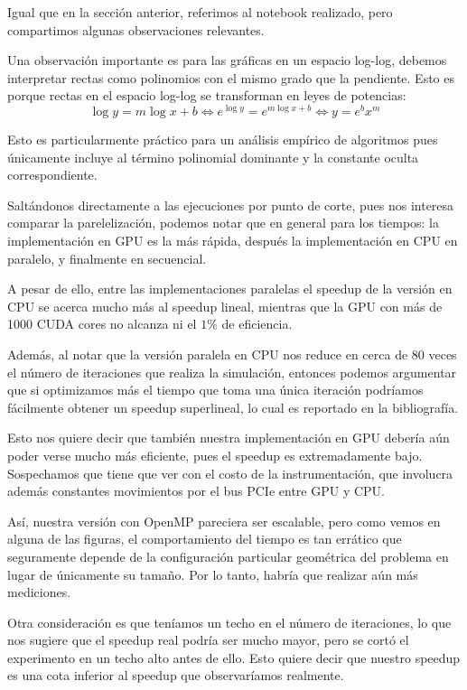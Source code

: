 \documentclass[main.tex]{subfiles}
\begin{document}
Igual que en la sección anterior, referimos al notebook realizado, pero
compartimos algunas observaciones relevantes.

Una observación importante es para las gráficas en un espacio log-log, debemos
interpretar rectas como polinomios con el mismo grado que la pendiente. Esto es
porque rectas en el espacio log-log se transforman en leyes de potencias:
$$\log{y} = m\log{x} + b \iff e^{\log{y}} = e^{m\log{x}+b} \iff y = e^bx^m$$

Esto es particularmente práctico para un análisis empírico de algoritmos pues
únicamente incluye al término polinomial dominante y la constante oculta
correspondiente.

Saltándonos directamente a las ejecuciones por punto de corte, pues nos interesa
comparar la parelelización, podemos notar que en general para los tiempos: la
implementación en GPU es la más rápida, después la implementación en CPU en
paralelo, y finalmente en secuencial.

A pesar de ello, entre las implementaciones paralelas el speedup de la versión
en CPU se acerca mucho más al speedup lineal, mientras que la GPU con más de 1000
CUDA cores no alcanza ni el $1\%$ de eficiencia.

Además, al notar que la versión paralela en CPU nos reduce en cerca de 80 veces el
número de iteraciones que realiza la simulación, entonces podemos argumentar que si
optimizamos más el tiempo que toma una única iteración podríamos fácilmente obtener
un speedup superlineal, lo cual es reportado en la bibliografía. \parencite{alba_ch2}

Esto nos quiere decir que también nuestra implementación en GPU debería aún poder
verse mucho más eficiente, pues el speedup es extremadamente bajo. Sospechamos que
tiene que ver con el costo de la instrumentación, que involucra además constantes
movimientos por el bus PCIe entre GPU y CPU.

Así, nuestra versión con OpenMP pareciera ser escalable, pero como vemos en
alguna de las figuras, el comportamiento del tiempo es tan errático que
seguramente depende de la configuración particular geométrica del problema en
lugar de  únicamente su tamaño. Por lo tanto, habría que realizar aún más
mediciones.

Otra consideración es que teníamos un techo en el número de iteraciones, lo
que nos sugiere que el speedup real podría ser mucho mayor, pero se cortó el
experimento en un techo alto antes de ello. Esto quiere decir que nuestro
speedup es una cota inferior al speedup que observaríamos realmente.
\end{document}
